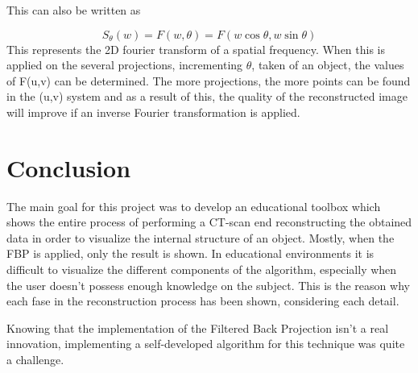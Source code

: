 \documentclass[9pt,journal,compsoc,twoside, a4paper]{elab}
\begin{document}
This can also be written as 

\begin{equation}
S_\theta  (w) = F(w,\theta ) = F(w\cos \theta ,w\sin \theta )
\label{FSTfinal}
\end{equation}
This represents the 2D fourier transform of a spatial frequency. When this is applied on the several projections, incrementing $\theta$, taken of an object, the values of F(u,v) can be determined. The more projections, the more points can be found in the (u,v) system  and as a result of this, the quality of the reconstructed image will improve if an inverse Fourier transformation is applied.



\section{Conclusion}
The main goal for this project was to develop an educational toolbox which shows the entire process of performing a CT-scan end reconstructing the obtained data in order to visualize the internal structure of an object. Mostly, when the FBP is applied, only the result is shown. In educational environments it is difficult to visualize the different components of the algorithm, especially when the user doesn't possess enough knowledge on the subject. This is the reason why each fase in the reconstruction process has been shown, considering each detail. \par Knowing that the implementation of the Filtered Back Projection isn't a real innovation, implementing a self-developed algorithm for this technique was quite a challenge. 





\end{document}

